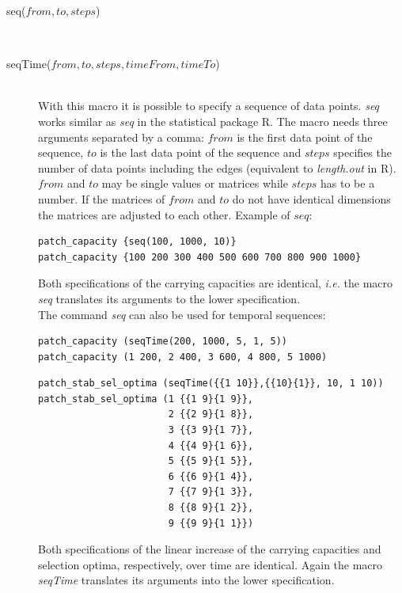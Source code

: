 \documentclass[letterpaper,12pt,oneside]{book}
\begin{document}
\begin{description}
\item[seq($from, to, steps$)]\hspace*{\fill}\\
\vspace{-9mm}
\item[seqTime($from, to, steps, timeFrom, timeTo$)]\hspace*{\fill}\\
With this macro it is possible to specify a sequence of data points. \textit{seq} works similar as \textit{seq} in the statistical package R. The macro needs three arguments separated by a comma: $from$ is the first data point of the sequence, $to$ is the last data point of the sequence and $steps$ specifies the number of data points including the edges (equivalent to \textit{length.out} in R). $from$ and $to$ may be single values or matrices while $steps$ has to be a number. If the matrices of $from$ and $to$ do not have identical dimensions the matrices are adjusted to each other. Example of $seq$:
\begin{lstlisting}[frame=single]
patch_capacity {seq(100, 1000, 10)}
patch_capacity {100 200 300 400 500 600 700 800 900 1000}
\end{lstlisting}
Both specifications of the carrying capacities are identical, \textit{i.e.} the macro \textit{seq} translates its arguments to the lower specification.\\
The command \textit{seq} can also be used for temporal sequences:
\begin{lstlisting}[frame=single]
patch_capacity (seqTime(200, 1000, 5, 1, 5))
patch_capacity (1 200, 2 400, 3 600, 4 800, 5 1000)
\end{lstlisting}
\begin{lstlisting}[frame=single]
patch_stab_sel_optima (seqTime({{1 10}},{{10}{1}}, 10, 1 10))
patch_stab_sel_optima (1 {{1 9}{1 9}}, 
                       2 {{2 9}{1 8}}, 
                       3 {{3 9}{1 7}}, 
                       4 {{4 9}{1 6}}, 
                       5 {{5 9}{1 5}}, 
                       6 {{6 9}{1 4}}, 
                       7 {{7 9}{1 3}}, 
                       8 {{8 9}{1 2}}, 
                       9 {{9 9}{1 1}})
\end{lstlisting}
Both specifications of the linear increase of the carrying capacities and selection optima, respectively, over time are identical. Again the macro \textit{seqTime} translates its arguments into the lower specification.     


\end{description}
\end{document}

